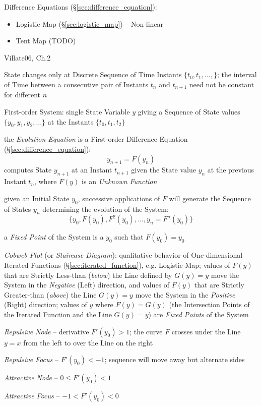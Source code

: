 Difference Equations (\S\ref{sec:difference_equation}):
\begin{itemize}
  \item Logistic Map (\S\ref{sec:logistic_map}) -- Non-linear
  \item Tent Map (TODO)
\end{itemize}

Villate06, Ch.2

State changes only at Discrete Sequence of Time Instants $\{t_0, t_1, \ldots,
\}$; the interval of Time between a consecutive pair of Instants $t_n$ and
$t_{n+1}$ need not be constant for different $n$

First-order System: single State Variable $y$ giving a Sequence of State values
$\{y_0, y_1, y_2, \ldots\}$ at the Instants $\{t_0, t_1, t_2\}$

the \emph{Evolution Equation} is a First-order Difference Equation
(\S\ref{sec:difference_equation}):
\[
  y_{n+1} = F(y_n)
\]
computes State $y_{n+1}$ at an Instant $t_{n+1}$ given the State value $y_n$ at
the previous Instant $t_n$, where $F(y)$ is an \emph{Unknown Function}

given an Initial State $y_0$, successive applications of $F$ will generate the
Sequence of States $y_n$ determining the evolution of the System:
\[
  \{ y_0, F(y_0), F^2(y_0), \ldots, y_n = F^n(y_0) \}
\]

a \emph{Fixed Point} of the System is a $y_0$ such that $F(y_0) = y_0$

\emph{Cobweb Plot} (or \emph{Staircase Diagram}): qualitative behavior of
One-dimensional Iterated Functions (\S\ref{sec:iterated_function}), e.g.
Logistic Map; values of $F(y)$ that are Strictly Less-than (\emph{below}) the
Line defined by $G(y) = y$ move the System in the \emph{Negative} (Left)
direction, and values of $F(y)$ that are Strictly Greater-than (\emph{above})
the Line $G(y) = y$ move the System in the \emph{Positive} (Right) direction;
values of $y$ where $F(y) = G(y)$ (the Intersection Points of the Iterated
Function and the Line $G(y) = y$) are \emph{Fixed Points} of the System

\emph{Repulsive Node} -- derivative $F'(y_0) > 1$; the curve $F$ crosses under
the Line $y=x$ from the left to over the Line on the right

\emph{Repulsive Focus} -- $F'(y_0) < -1$; sequence will move
away but alternate sides

\emph{Attractive Node} -- $0 \leq F'(y_0) < 1$

\emph{Attractive Focus} -- $-1 < F'(y_0) < 0$

